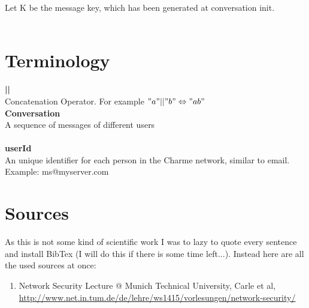 \documentclass{scrartcl}
\begin{document}
Let K be the message key, which has been generated at conversation init.\\\\

\section{Terminology}

\textbf{||}\\
 Concatenation Operator. For example $"a" || "b" \Leftrightarrow "ab" $
\\

\textbf{Conversation}\\ A sequence of messages of different users
\\\\
\textbf{userId}\\  An unique identifier for each person in the Charme network, similar to email. Example: ms@myserver.com



\section{Sources}
As this is not some kind of scientific work I was to lazy to quote every sentence and install BibTex (I will do this if there is some time left...). Instead here are all the used sources at once: 
\begin{enumerate}
\item Network Security Lecture @ Munich Technical University, Carle et al,  \url{http://www.net.in.tum.de/de/lehre/ws1415/vorlesungen/network-security/}
\end{enumerate}
  
\end{document}
